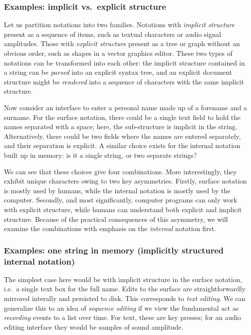 \documentclass[english,submission]{programming}
\begin{document}
\hypertarget{examples-implicit-vs.-explicit-structure}{%
\subsubsection{Examples: implicit vs.~explicit
structure}\label{examples-implicit-vs.-explicit-structure}}

Let us partition notations into two families. Notations with
\emph{implicit structure} present as a sequence of items, such as
textual characters or audio signal amplitudes. Those with \emph{explicit
structure} present as a tree or graph without an obvious order, such as
shapes in a vector graphics editor. These two types of notations can be
transformed into each other: the implicit structure contained in a
string can be \emph{parsed} into an explicit syntax tree, and an
explicit document structure might be \emph{rendered} into a sequence of
characters with the same implicit structure.

Now consider an interface to enter a personal name made up of a forename
and a surname. For the surface notation, there could be a single text
field to hold the names separated with a space; here, the sub-structure
is implicit in the string. Alternatively, there could be two fields
where the names are entered separately, and their separation is
explicit. A similar choice exists for the internal notation built up in
memory: is it a single string, or two separate strings?

We can see that these choices give four combinations. More
interestingly, they exhibit unique characters owing to two key
asymmetries. Firstly, surface notation is mostly used by humans, while
the internal notation is mostly used by the computer. Secondly, and most
significantly, computer programs can only work with explicit structure,
while humans can understand both explicit and implicit structure.
 Because of the practical
consequences of this asymmetry, we will examine the combinations with
emphasis on the \emph{internal} notation first.

\hypertarget{examples-one-string-in-memory-implicitly-structured-internal-notation}{%
\subsubsection{Examples: one string in memory (implicitly structured
internal
notation)}\label{examples-one-string-in-memory-implicitly-structured-internal-notation}}

The simplest case here would be with implicit structure in the surface
notation, i.e.~a single text box for the full name. Edits to the surface
are straightforwardly mirrored interally and persisted to disk. This
corresponds to \emph{text editing}. We can generalize this to an idea of
\emph{sequence editing} if we view the fundamental act as
\emph{recording} events to a list over time. For text, these are key
presses; for an audio editing interface they would be samples of sound
amplitude.
\end{document}

